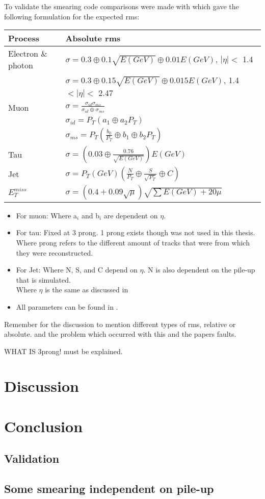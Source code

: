 To validate the smearing code comparisons were made with \citep{ATL-PHYS-PUB-2013-004} which gave the following formulation for the expected rms: 
\begin{table}[h]
\renewcommand{\arraystretch}{1.5} %
\begin{tabular}{|l|l|}
\hline
Process & Absolute rms \\ \hline
Electron \& photon & $\sigma=0.3\oplus 0.1\sqrt{E(GeV)}\oplus 0.01E(GeV)$, $|\eta|<$ 1.4 \\
& $\sigma=0.3\oplus 0.15\sqrt{E(GeV)}\oplus 0.015E(GeV)$, 1.4 $<|\eta|<$ 2.47 \\ \hline 
Muon & $\sigma=\frac{\sigma_{id} \sigma_{ms}}{\sigma_{id} \oplus \sigma_{ms}}$\\
& $\sigma_{id}=P_T(a_1 \oplus a_2 P_T)$\\
& $\sigma_{ms}=P_T(\frac{b_0}{P_T} \oplus b_1 \oplus b_2 P_T)$\\ \hline
Tau & $\sigma =(0.03\oplus \frac{0.76}{\sqrt{E(GeV)}})E(GeV)$ \\ \hline
Jet & $\sigma = P_T(GeV)(\frac{N}{P_T} \oplus \frac{S}{\sqrt{P_T}} \oplus C)$ \\ \hline
$E_T^{miss}$ & $\sigma = (0.4+0.09\sqrt{\mu})\sqrt{\sum E(GeV)+20\mu}$ \\ \hline
\end{tabular}
\renewcommand{\arraystretch}{1.0} %
\end{table}
\begin{itemize}
\item For muon: Where a$_i$ and b$_i$ are dependent on $\eta$.
\item For tau: Fixed at 3 prong. 1 prong exists though was not used in this thesis. \\
Where prong refers to the different amount of tracks that were from which they were reconstructed.
\item For Jet: Where N, S, and C depend on $\eta$. N is also dependent on the pile-up that is simulated.\\
Where $\eta$ is the same as discussed in 
\item All parameters can be found in \citep{ATL-PHYS-PUB-2013-004}.
\end{itemize}

Remember for the discussion to mention different types of rms, relative or absolute. and the problem which occurred with this and the papers faults.

WHAT IS 3prong! must be explained.
\section{Discussion}
\section{Conclusion}
\subsection{Validation}
\subsection{Some smearing independent on pile-up}
